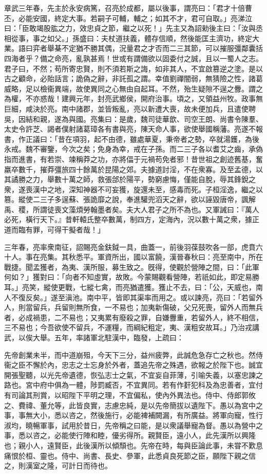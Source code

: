 \begin{pinyinscope}
章武三年春，先主於永安病篤，召亮於成都，屬以後事，謂亮曰：「君才十倍曹丕，必能安國，終定大事。若嗣子可輔，輔之；如其不才，君可自取。」亮涕泣曰：「臣敢竭股肱之力，效忠貞之節，繼之以死！」先主又為詔勑後主曰：「汝與丞相從事，事之如父。」孫盛曰：夫杖道扶義，體存信順，然後能匡主濟功，終定大業。語曰弈者舉棊不定猶不勝其偶，況量君之才否而二三其節，可以摧服彊鄰囊括四海者乎？備之命亮，亂孰甚焉！世或有謂備欲以固委付之誠，且以一蜀人之志。君子曰，不然；苟所寄忠賢，則不須若斯之誨，如非其人，不宜啟篡逆之塗。是以古之顧命，必貽話言；詭偽之辭，非託孤之謂。幸值劉禪闇弱，無猜險之性，諸葛威略，足以檢衞異端，故使異同之心無由自起耳。不然，殆生疑隙不逞之釁。謂之為權，不亦惑哉！建興元年，封亮武鄉侯，開府治事。頃之，又領益州牧。政事無巨細，咸決於亮。南中諸郡，並皆叛亂，亮以新遭大喪，故未便加兵，且遣使聘吳，因結和親，遂為與國。亮集曰：是歲，魏司徒華歆、司空王朗、尚書令陳羣、太史令許芝、謁者僕射諸葛璋各有書與亮，陳天命人事，欲使舉國稱藩。亮遂不報書，作正議曰：「昔在項羽，起不由德，雖處華夏，秉帝者之勢，卒就湯鑊，為後永戒。魏不審鑒，今次之矣；免身為幸，戒在子孫。而二三子各以耆艾之齒，承偽指而進書，有若崇、竦稱莽之功，亦將偪于元禍苟免者邪！昔世祖之創迹舊基，奮羸卒數千，摧莽彊旅四十餘萬於昆陽之郊。夫據道討淫，不在衆寡。及至孟德，以其譎勝之力，舉數十萬之師，救張郃於陽平，勢窮慮悔，僅能自脫，辱其鋒銳之衆，遂喪漢中之地，深知神器不可妄獲，旋還未至，感毒而死。子桓淫逸，繼之以篡。縱使二三子多逞蘇、張詭靡之說，奉進驩兜滔天之辭，欲以誣毀唐帝，諷解禹、稷，所謂徒喪文藻煩勞翰墨者矣。夫大人君子之所不為也。又軍誡曰：『萬人必死，橫行天下。』昔軒轅氏整卒數萬，制四方，定海內，況以數十萬之衆，據正道而臨有罪，可得干擬者哉！」

三年春，亮率衆南征，詔賜亮金鈇鉞一具，曲蓋一，前後羽葆鼓吹各一部，虎賁六十人。事在亮集。其秋悉平。軍資所出，國以富饒，漢晉春秋曰：亮至南中，所在戰捷。聞孟獲者，為夷、漢所服，募生致之。旣得，使觀於營陣之間，曰：「此軍何如？」獲對曰：「向者不知虛實，故敗。今蒙賜觀看營陣，若祇如此，即定易勝耳。」亮笑，縱使更戰，七縱七禽，而亮猶遣獲。獲止不去，曰：「公，天威也，南人不復反矣。」遂至滇池。南中平，皆即其渠率而用之。或以諫亮，亮曰：「若留外人，則當留兵，兵留則無所食，一不易也；加夷新傷破，父兄死喪，留外人而無兵者，必成禍患，二不易也；又夷累有廢殺之罪，自嫌釁重，若留外人，終不相信，三不易也；今吾欲使不留兵，不運糧，而綱紀粗定，夷、漢粗安故耳。」乃治戎講武，以俟大舉。五年，率諸軍北駐漢中，臨發，上疏曰：

先帝創業未半，而中道崩殂，今天下三分，益州疲弊，此誠危急存亡之秋也。然侍衞之臣不懈於內，忠志之士忘身於外者，蓋追先帝之殊遇，欲報之於陛下也。誠宜開張聖聽，以光先帝遺德，恢弘志士之氣，不宜妄自菲薄，引喻失義，以塞忠諫之路也。宮中府中俱為一體，陟罰臧否，不宜異同。若有作姧犯科及為忠善者，宜付有司論其刑賞，以昭陛下平明之理，不宜偏私，使內外異法也。侍中、侍郎郭攸之、費禕、董允等，此皆良實，志慮忠純，是以先帝簡拔以遺陛下。愚以為宮中之事，事無大小，悉以咨之，然後施行，必能裨補闕漏，有所廣益。將軍向寵，性行淑均，曉暢軍事，試用於昔日，先帝稱之曰能，是以衆議舉寵為督。愚以為營中之事，悉以咨之，必能使行陣和睦，優劣得所。親賢臣，遠小人，此先漢所以興隆也；親小人，遠賢臣，此後漢所以傾頹也。先帝在時，每與臣論此事，未甞不歎息痛恨於桓、靈也。侍中、尚書、長史、參軍，此悉貞良死節之臣，願陛下親之信之，則漢室之隆，可計日而待也。


\end{pinyinscope}
